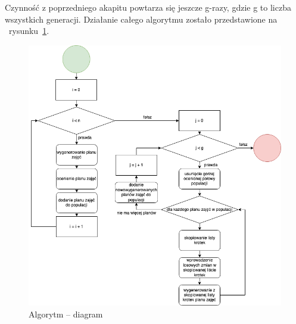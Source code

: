     Czynność z poprzedniego akapitu powtarza się jeszcze g-razy, gdzie g to liczba wszystkich generacji. Działanie całego algorytmu zostało przedstawione na ~rysunku~\ref{rys:alf_flow}.


\begin{figure}[h]
\centering\includegraphics[width=\textwidth]{figures/alg_flow}
\caption{Algorytm -- diagram}\label{rys:alf_flow}
\end{figure}



